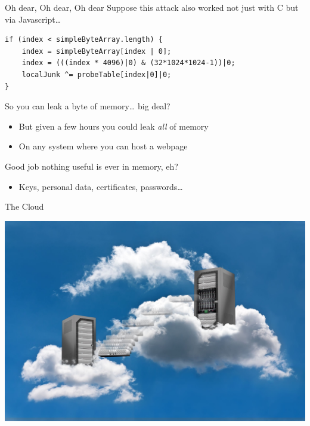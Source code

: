 \documentclass[9pt,aspectratio=169]{beamer}
\begin{document}
\begin{frame}[label={sec:org824e91f},fragile]{Oh dear, Oh dear, Oh dear}
 Suppose this attack also worked not just with C but via Javascript\ldots{}

\begin{verbatim}
if (index < simpleByteArray.length) {
    index = simpleByteArray[index | 0];
    index = (((index * 4096)|0) & (32*1024*1024-1))|0;
    localJunk ^= probeTable[index|0]|0;
}
\end{verbatim}

So you can leak a byte of memory\ldots{} big deal?
\begin{itemize}
\item But given a few hours you could leak \emph{all} of memory
\item On any system where you can host a webpage
\end{itemize}

\begin{block}{Good job nothing useful is ever in memory, eh?}
\begin{itemize}
\item Keys, personal data, certificates, passwords\ldots{}
\end{itemize}
\end{block}
\end{frame}


\begin{frame}[label={sec:orga6a39e6}]{The Cloud}
\begin{center}
\includegraphics[width=.9\linewidth]{./cloud.jpg}
\end{center}
\end{frame}
\end{document}
